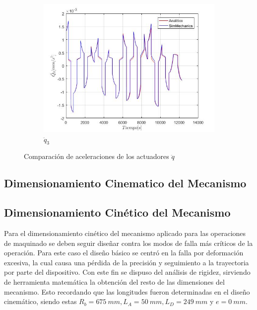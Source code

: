 \begin{figure}
\begin{subfigure}{0.45\textwidth}
        \includegraphics[width=\linewidth]{Cap4_DisenoBasico/Figura/ComparativoSimMechanics/QPPunto3.jpg}
        \caption{$\ddot{q}_3$}
    \end{subfigure}
    \caption{Comparación de aceleraciones de los actuadores $\ddot{q}$}
\end{figure}

\newpage
\subsection{Dimensionamiento Cinematico del Mecanismo}


\newpage


\newpage
\subsection{Dimensionamiento Cinético del Mecanismo}
Para el dimensionamiento cinético del mecanismo aplicado para las operaciones de maquinado se deben seguir diseñar contra los modos de falla más críticos de la operación. Para este caso el diseño básico se centró en la falla por deformación excesiva, la cual causa una pérdida de la precisión y seguimiento a la trayectoria por parte del dispositivo. Con este fin se dispuso del análisis de rigidez, sirviendo de herramienta matemática la obtención del resto de las dimensiones del mecanismo. Esto recordando que las longitudes fueron determinadas en el diseño cinemático, siendo estas $R_b = 675~mm, L_A = 50~mm, L_D = 249~mm$ y $e = 0~mm$.

